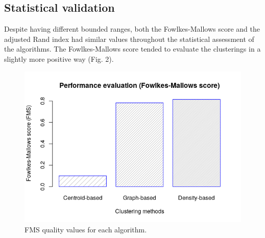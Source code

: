 \documentclass[nocrop]{bioinfo}
\begin{document}
\subsection{Statistical validation}
Despite having different bounded ranges, both the Fowlkes-Mallows score and the adjusted Rand index had similar values throughout the statistical assessment of the algorithms. The Fowlkes-Mallows score tended to evaluate the clusterings in a slightly more positive way (Fig. 2).
\begin{figure}[ht]
\centering
\includegraphics[scale=0.45]{img/fms.png}
\caption{FMS quality values for each algorithm.}\label{fig:02}
\end{figure}
\end{document}
